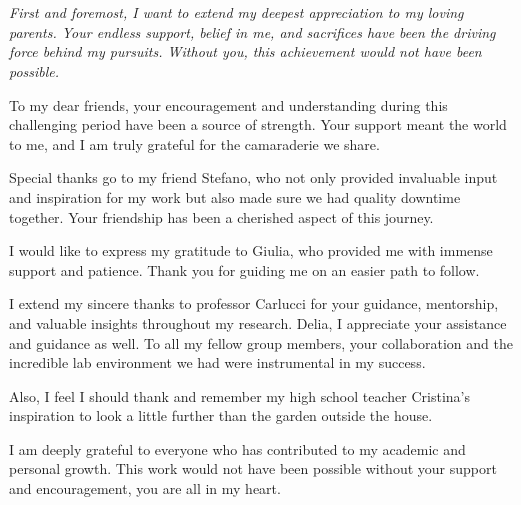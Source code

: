 \documentclass[a4,11pt,openright]{report}
\begin{document}
\chapter*{} %
\vspace*{\fill}
\begin{flushleft}
	\it
	First and foremost, I want to extend my deepest appreciation to my loving parents. Your endless support, belief in me, and sacrifices have been the driving force behind my pursuits. Without you, this achievement would not have been possible.

	To my dear friends, your encouragement and understanding during this challenging period have been a source of strength. Your support meant the world to me, and I am truly grateful for the camaraderie we share.

	Special thanks go to my friend Stefano, who not only provided invaluable input and inspiration for my work but also made sure we had quality downtime together. Your friendship has been a cherished aspect of this journey.

	I would like to express my gratitude to Giulia, who provided me with immense support and patience. Thank you for guiding me on an easier path to follow.

	I extend my sincere thanks to professor Carlucci for your guidance, mentorship, and valuable insights throughout my research. Delia, I appreciate your assistance and guidance as well. To all my fellow group members, your collaboration and the incredible lab environment we had were instrumental in my success.

	Also, I feel I should thank and remember my high school teacher Cristina's inspiration to look a little further than the garden outside the house.

	I am deeply grateful to everyone who has contributed to my academic and personal growth. This work would not have been possible without your support and encouragement, you are all in my heart.
	\vspace*{\fill}

\end{flushleft}
\vspace*{\fill}

\afterpage{\blankpage}

\end{document}
